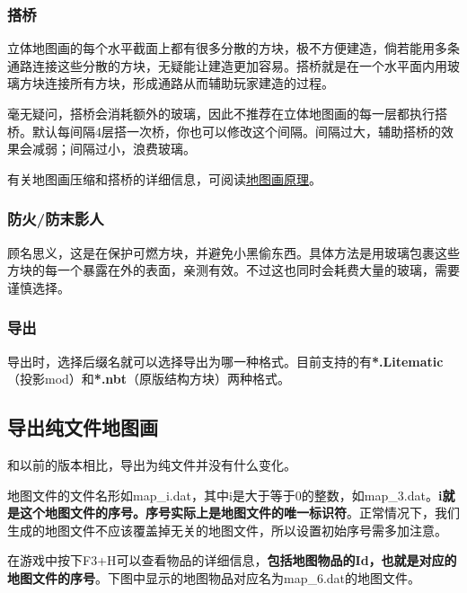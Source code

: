 \documentclass[UTF8]{ctexart}
\begin{document}
    \subsubsection{搭桥}
    立体地图画的每个水平截面上都有很多分散的方块，极不方便建造，倘若能用多条通路连接这些分散的方块，无疑能让建造更加容易。搭桥就是在一个水平面内用玻璃方块连接所有方块，形成通路从而辅助玩家建造的过程。
    
    毫无疑问，搭桥会消耗额外的玻璃，因此不推荐在立体地图画的每一层都执行搭桥。默认每间隔4层搭一次桥，你也可以修改这个间隔。间隔过大，辅助搭桥的效果会减弱；间隔过小，浪费玻璃。
    
    有关地图画压缩和搭桥的详细信息，可阅读\href{https://github.com/ToKiNoBug/SlopeCraftTutorial/blob/main/BasicPrinciple/Principle%20of%20map%20pixel%20arts.md}{地图画原理}。

    \subsubsection{防火/防末影人}
    顾名思义，这是在保护可燃方块，并避免小黑偷东西。具体方法是用玻璃包裹这些方块的每一个暴露在外的表面，亲测有效。不过这也同时会耗费大量的玻璃，需要谨慎选择。

    \subsubsection{导出}
    导出时，选择后缀名就可以选择导出为哪一种格式。目前支持的有\textbf{*.Litematic}（投影mod）和\textbf{*.nbt}（原版结构方块）两种格式。

    \subsection{导出纯文件地图画}
    和以前的版本相比，导出为纯文件并没有什么变化。

    地图文件的文件名形如map\_i.dat，其中i是大于等于0的整数，如map\_3.dat。\textbf{i就是这个地图文件的序号。序号实际上是地图文件的唯一标识符}。正常情况下，我们生成的地图文件不应该覆盖掉无关的地图文件，所以设置初始序号需多加注意。

   在游戏中按下F3+H可以查看物品的详细信息，\textbf{包括地图物品的Id，也就是对应的地图文件的序号}。下图中显示的地图物品对应名为map\_6.dat的地图文件。
\end{document}
